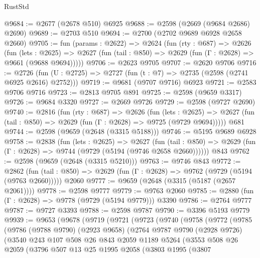 \begin{lexlean}{RustStd}
\begin{coremodule}
@9684 := @2677 (@2678 @510) @6925
@9688 := @2598 (@2669 (@9684 @2686) @2690)
@9689 := @2703 @510
@9694 := @2700 (@2702 @9689 @6928 @2658 @2660)
@9705 := fun (params : @2622) =>
  @2624
    (fun (rty : @687) =>
    @2626
      (fun (lets : @2625) =>
      @2627 (fun (tail : @850) => @2629 (fun (Γ : @2628) => @9661 (@9688 @9694)))))
@9706 := @2623 @9705
@9707 := @2620 @9706
@9716 := @2726 (fun (U : @2725) => @2727 (fun (t : @7) => @2735 (@2598 (@2741 @6925 @2616) @2752)))
@9719 := @9681 (@9707 @9716) @6923
@9721 := @2583 @9706 @9716
@9723 := @2813 @9705 @891
@9725 := @2598 (@9659 @3317)
@9726 := @9684 @3320
@9727 := @2669 @9726
@9729 := @2598 (@9727 @2690)
@9740 := @2816
    (fun (rty : @687) =>
    @2626
      (fun (lets : @2625) =>
      @2627 (fun (tail : @850) => @2629 (fun (Γ : @2628) => @9725 (@9729 @9694)))))
    @681
@9744 := @2598 (@9659 (@2648 (@3315 @5188)))
@9746 := @5195 @9689 @6928
@9758 := @2838
    (fun (lets : @2625) =>
    @2627
      (fun (tail : @850) => @2629 (fun (Γ : @2628) => @9744 (@9729 (@5194 (@9746 @2658 @2660))))))
    @843
@9762 := @2598 (@9659 (@2648 (@3315 @5210)))
@9763 := @9746 @843
@9772 := @2862
    (fun (tail : @850) => @2629 (fun (Γ : @2628) => @9762 (@9729 (@5194 (@9763 @2660)))))
    @2060
@9777 := @9659 (@2648 (@3315 (@5187 (@2657 @2061))))
@9778 := @2598 @9777
@9779 := @9763 @2060
@9785 := @2880 (fun (Γ : @2628) => @9778 (@9729 (@5194 @9779))) @3390
@9786 := @2764 @9777
@9787 := @9727 @3393
@9788 := @2598 @9787
@9790 := @3396 @5193 @9779
@9939 := @9653
    (@9678
      (@9719
        (@9721
          (@9723
            (@9740
              (@9758
                (@9772
                  (@9785
                    (@9786
                      (@9788 @9790)
                      (@2923 @9658)
                      (@2764
                        @9787
                        @9790
                        (@2928 @9726)
                        (@3540
                          @243
                          @107
                          @508
                          @26
                          @843
                          @2059
                          @1189
                          @5264
                          (@3553
                            @508
                            @26
                            @2059
                            (@3796
                              @507
                              @13
                              @25
                              @1995
                              @2058
                              (@3803
                                @1995
                                (@3807

\end{coremodule}
\end{lexlean}
